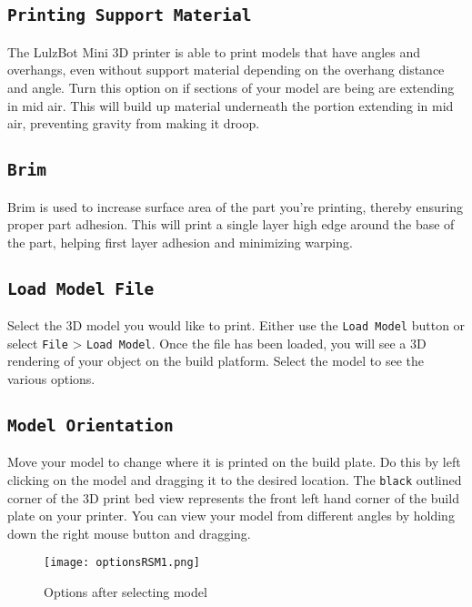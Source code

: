 \subsection{\texttt{Printing Support Material}}
The LulzBot Mini 3D printer is able to print models that have angles and overhangs, even without support material depending on the overhang distance and angle. Turn this option on if sections of your model are being are extending in mid air. This will build up material underneath the portion extending in mid air, preventing gravity from making it droop.

\subsection{\texttt{Brim}}
Brim is used to increase surface area of the part you're printing, thereby ensuring proper part adhesion. This will print a single layer high edge around the base of the part, helping first layer adhesion and minimizing warping.

\subsection{\texttt{Load Model File}}
Select the 3D model you would like to print. Either use the \texttt{Load Model} button or select \texttt{File} > \texttt{Load Model}. Once the file has been loaded, you will see a 3D rendering of your object on the build platform. Select the model to see the various options. 

\subsection{\texttt{Model Orientation}}
Move your model to change where it is printed on the build plate. Do this by left clicking on the model and dragging it to the desired location. The \texttt{black} outlined corner of the 3D print bed view represents the front left hand corner of the build plate on your printer. You can view your model from different angles by holding down the right mouse button and dragging. %
\begin{figure}[H]
\centering
\texttt{[image: optionsRSM1.png]}
\caption{Options after selecting model}
\label{fig:Orientation}
\end{figure}

